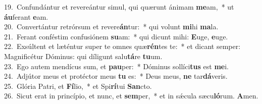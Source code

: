 {19.~}Confundántur et revereántur simul, qui quærunt ánimam \textbf{me}am,~* ut \textbf{áu}ferant \textbf{e}am.\\
{20.~}Convertántur retrórsum et revere\textbf{án}tur:~* qui volunt \textbf{mi}hi \textbf{ma}la.\\
{21.~}Ferant conféstim confusiónem \textbf{su}am:~* qui dicunt mihi: \textbf{E}uge, \textbf{e}uge.\\
{22.~}Exsúltent et læténtur super te omnes quæ\textbf{rén}tes te:~* et dicant semper: Magnificétur Dóminus: qui díligunt salu\textbf{tá}re \textbf{tu}um.\\
{23.~}Ego autem mendícus sum, et \textbf{pau}per:~* Dóminus sollíci\textbf{tus} est \textbf{me}i.\\
{24.~}Adjútor meus et protéctor meus \textbf{tu} es:~* Deus meus, \textbf{ne} tar\textbf{dá}veris.\\
{25.~}Glória Patri, et \textbf{Fí}lio,~* et Spi\textbf{rí}tui \textbf{San}cto.\\
{26.~}Sicut erat in princípio, et nunc, et \textbf{sem}per,~* et in sǽcula sæcu\textbf{ló}rum. \textbf{A}men.\\
